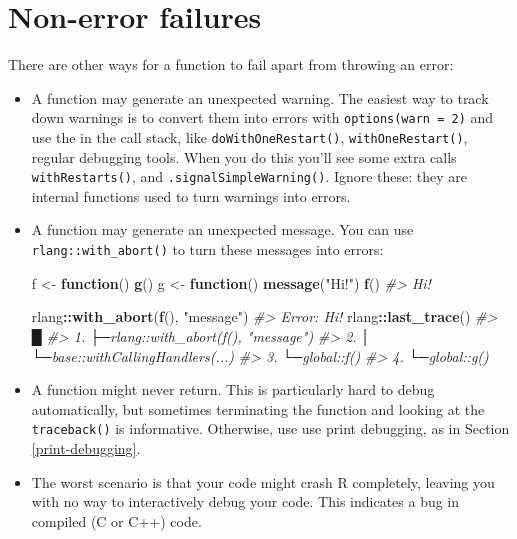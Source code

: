 \documentclass[]{book}
\newenvironment{Shaded}{\begin{snugshade}}{\end{snugshade}}
\newcommand{\CommentTok}[1]{\textcolor[rgb]{0.37,0.37,0.37}{\textit{#1}}}
\newcommand{\ControlFlowTok}[1]{\textcolor[rgb]{0.27,0.27,0.27}{\textbf{#1}}}
\newcommand{\KeywordTok}[1]{\textcolor[rgb]{0.27,0.27,0.27}{\textbf{#1}}}
\newcommand{\NormalTok}[1]{#1}
\newcommand{\OperatorTok}[1]{\textcolor[rgb]{0.43,0.43,0.43}{\textbf{#1}}}
\newcommand{\StringTok}[1]{\textcolor[rgb]{0.5,0.5,0.5}{#1}}
\begin{document}
\hypertarget{non-error-failures}{%
\section{Non-error failures}\label{non-error-failures}}


There are other ways for a function to fail apart from throwing an error:

\begin{itemize}
\item
  A function may generate an unexpected warning. The easiest way to track down
  warnings is to convert them into errors with \texttt{options(warn\ =\ 2)} and use the
  in the call stack, like \texttt{doWithOneRestart()}, \texttt{withOneRestart()},
  regular debugging tools. When you do this you'll see some extra calls
  \texttt{withRestarts()}, and \texttt{.signalSimpleWarning()}. Ignore these: they are
  internal functions used to turn warnings into errors.
\item
  A function may generate an unexpected message. You can use
  \texttt{rlang::with\_abort()} to turn these messages into errors:

\begin{Shaded}
\begin{Highlighting}[]
\NormalTok{f <-}\StringTok{ }\ControlFlowTok{function}\NormalTok{() }\KeywordTok{g}\NormalTok{()}
\NormalTok{g <-}\StringTok{ }\ControlFlowTok{function}\NormalTok{() }\KeywordTok{message}\NormalTok{(}\StringTok{"Hi!"}\NormalTok{)}
\KeywordTok{f}\NormalTok{()}
\CommentTok{#> Hi!}

\NormalTok{rlang}\OperatorTok{::}\KeywordTok{with_abort}\NormalTok{(}\KeywordTok{f}\NormalTok{(), }\StringTok{"message"}\NormalTok{)}
\CommentTok{#> Error: Hi!}
\NormalTok{rlang}\OperatorTok{::}\KeywordTok{last_trace}\NormalTok{()}
\CommentTok{#>     █}
\CommentTok{#>  1. ├─rlang::with_abort(f(), "message")}
\CommentTok{#>  2. │ └─base::withCallingHandlers(...)}
\CommentTok{#>  3. └─global::f()}
\CommentTok{#>  4.   └─global::g()}
\end{Highlighting}
\end{Shaded}
\item
  A function might never return. This is particularly hard to debug
  automatically, but sometimes terminating the function and looking at the
  \texttt{traceback()} is informative. Otherwise, use use print debugging,
  as in Section \ref{print-debugging}.
\item
  The worst scenario is that your code might crash R completely, leaving you
  with no way to interactively debug your code. This indicates a bug in
  compiled (C or C++) code.


\end{itemize}
\end{document}

